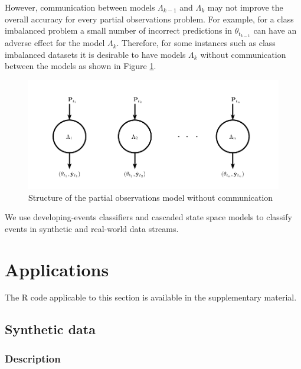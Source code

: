 \documentclass[a4paper,11pt]{article}
\begin{document}
However, communication between models $\Lambda_{k-1}$ and $\Lambda_k$ may not improve the overall accuracy for every partial observations problem. For example, for a class imbalanced problem a small number of incorrect predictions in $\theta_{t_{k-1}}$ can have an adverse effect for the model $\Lambda_k$. Therefore, for some instances such as class imbalanced datasets it is desirable to have models $\Lambda_k$ without communication between the models as shown in Figure \ref{fig:PODLM2}.

\begin{figure}[H]
	\centering
	\includegraphics[clip=true,scale=0.8]{./Graphics/Lots_of_circles_4.pdf}
	\caption{\footnotesize Structure of the partial observations model without communication}
	\label{fig:PODLM2}
\end{figure}

We use developing-events classifiers and cascaded state space models to classify events in synthetic and real-world data streams.

\section{Applications} \label{sec:Experiments}

The R code applicable to this section is available in the supplementary material.

\subsection{Synthetic data}\label{subsec:Synthetic}

\subsubsection{Description}
\end{document}
